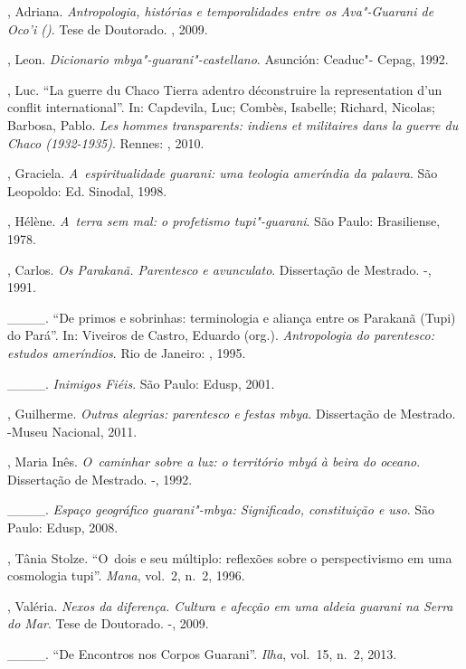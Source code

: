 \begin{Parskip}
, Adriana. \emph{Antropologia, histórias e
temporalidades entre os Ava"-Guarani de Oco’i ()}. Tese de Doutorado.
, 2009.

, Leon. \emph{Dicionario mbya"-guarani"-castellano}. Asunción: Ceaduc"-
Cepag, 1992.

, Luc. ``La guerre du Chaco Tierra adentro déconstruire la
representation d’un conflit international''. In: Capdevila, Luc;
Combès, Isabelle; Richard, Nicolas; Barbosa, Pablo. \emph{Les
hommes transparents: indiens et militaires dans la guerre du Chaco
(1932-1935)}. Rennes: , 2010.

, Graciela. \emph{A~espiritualidade guarani: uma teologia ameríndia
da palavra}. São Leopoldo: Ed. Sinodal, 1998.

, Hélène. \emph{A~terra sem mal: o profetismo tupi"-guarani}. São Paulo:
Brasiliense, 1978.

, Carlos. \emph{Os Parakanã. Parentesco e avunculato}. Dissertação de
Mestrado. -, 1991.

\_\_\_\_. ``De primos e sobrinhas: terminologia e aliança entre os Parakanã
(Tupi) do Pará''. In: Viveiros de Castro, Eduardo (org.). \emph{Antropologia do
parentesco: estudos ameríndios}. Rio de Janeiro: , 1995.

\_\_\_\_. \emph{Inimigos Fiéis}. São Paulo: Edusp, 2001.

, Guilherme. \emph{Outras alegrias: parentesco e festas mbya}.
 Dissertação de Mestrado. -Museu Nacional, 2011.

, Maria Inês. \emph{O~caminhar sobre a luz: o território mbyá à beira
do oceano}. Dissertação de Mestrado. -, 1992.

\_\_\_\_. \emph{Espaço geográfico guarani"-mbya: Significado,
constituição e uso}. São Paulo: Edusp, 2008.

, Tânia Stolze. ``O~dois e seu múltiplo: reflexões sobre o
perspectivismo em uma cosmologia tupi''. \emph{Mana}, vol.~2, n.~2, 1996.

, Valéria. \emph{Nexos da diferença. Cultura e afecção em uma aldeia
guarani na Serra do Mar}. Tese de Doutorado. -, 2009.

\_\_\_\_. ``De Encontros nos Corpos Guarani''. \emph{Ilha}, vol.~15, n.~2, 2013.


\end{Parskip}
